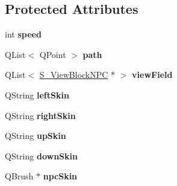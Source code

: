 \subsection*{Protected Attributes}
\begin{DoxyCompactItemize}
\item 
\hypertarget{class_g___n_p_c_acb2481a4b753ed1f9618bbfb5c4e7a4b}{}int {\bfseries speed}\label{class_g___n_p_c_acb2481a4b753ed1f9618bbfb5c4e7a4b}

\item 
\hypertarget{class_g___n_p_c_a4c9e6b61a5fc35781176a12e0df11bd6}{}Q\+List$<$ Q\+Point $>$ {\bfseries path}\label{class_g___n_p_c_a4c9e6b61a5fc35781176a12e0df11bd6}

\item 
\hypertarget{class_g___n_p_c_a20e935d7255a005d50ac2d4644718efd}{}Q\+List$<$ \hyperlink{class_s___view_block_n_p_c}{S\+\_\+\+View\+Block\+N\+P\+C} $\ast$ $>$ {\bfseries view\+Field}\label{class_g___n_p_c_a20e935d7255a005d50ac2d4644718efd}

\item 
\hypertarget{class_g___n_p_c_afe03234ee865fe65cde1ce68eb5061da}{}Q\+String {\bfseries left\+Skin}\label{class_g___n_p_c_afe03234ee865fe65cde1ce68eb5061da}

\item 
\hypertarget{class_g___n_p_c_a3ff2382f60cf7003c1c11db0aab40afa}{}Q\+String {\bfseries right\+Skin}\label{class_g___n_p_c_a3ff2382f60cf7003c1c11db0aab40afa}

\item 
\hypertarget{class_g___n_p_c_ab32e861a30a57ceefa70847038debb68}{}Q\+String {\bfseries up\+Skin}\label{class_g___n_p_c_ab32e861a30a57ceefa70847038debb68}

\item 
\hypertarget{class_g___n_p_c_a912f316ca696e28c5b969e25e33c06c3}{}Q\+String {\bfseries down\+Skin}\label{class_g___n_p_c_a912f316ca696e28c5b969e25e33c06c3}

\item 
\hypertarget{class_g___n_p_c_a7610a663ace50362e5b446ca11839b22}{}Q\+Brush $\ast$ {\bfseries npc\+Skin}\label{class_g___n_p_c_a7610a663ace50362e5b446ca11839b22}

\end{DoxyCompactItemize}
